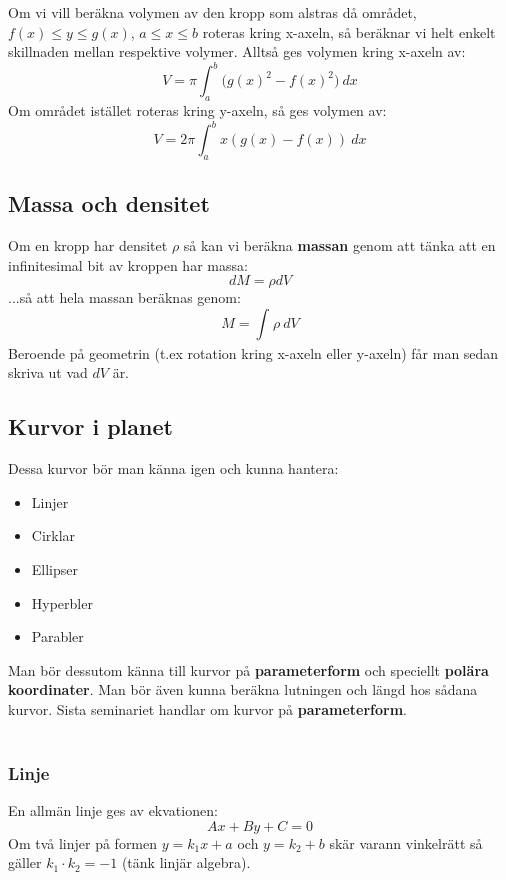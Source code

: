 \documentclass{report}
\begin{document}
\noindent
Om vi vill beräkna volymen av den kropp som alstras då området, $ f(x) \le y \le g(x) $, $ a \le x \le b $ roteras kring x-axeln, så beräknar vi helt enkelt skillnaden mellan respektive volymer. Alltså ges volymen kring x-axeln av:
\begin{equation*}
V = \pi \int_{a}^{b} \bigl( g(x)^2 - f(x)^2  \bigr) \: dx 
\end{equation*}
Om området istället roteras kring y-axeln, så ges volymen av:
\begin{equation*}
V = 2\pi \int_{a}^{b} x(g(x)-f(x) ) \: dx
\end{equation*}

\subsection{Massa och densitet}
Om en kropp har densitet $ \rho $ så kan vi beräkna \textbf{massan} genom att tänka att en infinitesimal bit av kroppen har massa:
\begin{equation*}
dM = \rho dV
\end{equation*}
...så att hela massan beräknas genom:
\begin{equation*}
M = \int_{}^{} \rho \: dV  
\end{equation*}
Beroende på geometrin (t.ex rotation kring x-axeln eller y-axeln) får man sedan skriva ut vad $ dV $ är. 

\subsection{Kurvor i planet}
Dessa kurvor bör man känna igen och kunna hantera:
\begin{itemize}
	\item Linjer
	\item Cirklar
	\item Ellipser
	\item Hyperbler
	\item Parabler
\end{itemize}
Man bör dessutom känna till kurvor på \textbf{parameterform} och speciellt \textbf{polära koordinater}. Man bör även kunna beräkna lutningen och längd hos sådana kurvor. Sista seminariet handlar om kurvor på \textbf{parameterform}.\\\\

\subsubsection{Linje}
En allmän linje ges av ekvationen:
\begin{equation*}
Ax+By+C = 0
\end{equation*}
Om två linjer på formen $ y = k_1 x +a  $ och $ y = k_2 + b $ skär varann vinkelrätt så gäller $ k_1 \cdot k_2 = -1 $ (tänk linjär algebra).\\\\
\end{document}
